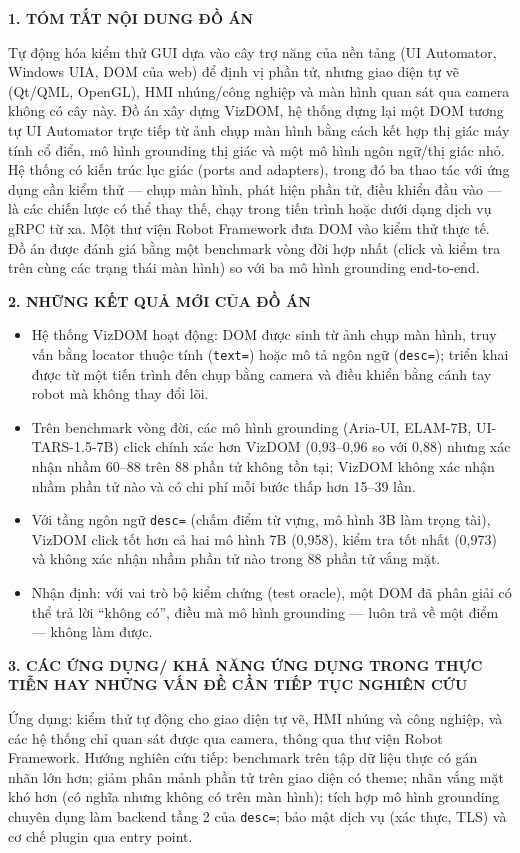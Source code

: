 \documentclass[11pt,a4paper]{article}
\newcommand{\code}[1]{\texttt{#1}}
\begin{document}
\textbf{1. TÓM TẮT NỘI DUNG ĐỒ ÁN}

Tự động hóa kiểm thử GUI dựa vào cây trợ năng của nền tảng (UI Automator, Windows
UIA, DOM của web) để định vị phần tử, nhưng giao diện tự vẽ (Qt/QML, OpenGL), HMI
nhúng/công nghiệp và màn hình quan sát qua camera không có cây này. Đồ án xây dựng
VizDOM, hệ thống dựng lại một DOM tương tự UI Automator trực tiếp từ ảnh chụp màn
hình bằng cách kết hợp thị giác máy tính cổ điển, mô hình grounding thị giác và một
mô hình ngôn ngữ/thị giác nhỏ. Hệ thống có kiến trúc lục giác (ports and adapters),
trong đó ba thao tác với ứng dụng cần kiểm thử --- chụp màn hình, phát hiện phần tử,
điều khiển đầu vào --- là các chiến lược có thể thay thế, chạy trong tiến trình hoặc
dưới dạng dịch vụ gRPC từ xa. Một thư viện Robot Framework đưa DOM vào kiểm thử thực
tế. Đồ án được đánh giá bằng một benchmark vòng đời hợp nhất (click và kiểm tra trên
cùng các trạng thái màn hình) so với ba mô hình grounding end-to-end.

\textbf{2. NHỮNG KẾT QUẢ MỚI CỦA ĐỒ ÁN}
\begin{itemize}[leftmargin=1.4em, itemsep=0.2em]
  \item Hệ thống VizDOM hoạt động: DOM được sinh từ ảnh chụp màn hình, truy vấn bằng
        locator thuộc tính (\code{text=}) hoặc mô tả ngôn ngữ (\code{desc=}); triển
        khai được từ một tiến trình đến chụp bằng camera và điều khiển bằng cánh tay
        robot mà không thay đổi lõi.
  \item Trên benchmark vòng đời, các mô hình grounding (Aria-UI, ELAM-7B,
        UI-TARS-1.5-7B) click chính xác hơn VizDOM (0,93--0,96 so với 0,88) nhưng
        xác nhận nhầm 60--88 trên 88 phần tử không tồn tại; VizDOM không xác nhận
        nhầm phần tử nào và có chi phí mỗi bước thấp hơn 15--39 lần.
  \item Với tầng ngôn ngữ \code{desc=} (chấm điểm từ vựng, mô hình 3B làm trọng tài),
        VizDOM click tốt hơn cả hai mô hình 7B (0,958), kiểm tra tốt nhất (0,973) và
        không xác nhận nhầm phần tử nào trong 88 phần tử vắng mặt.
  \item Nhận định: với vai trò bộ kiểm chứng (test oracle), một DOM đã phân giải có
        thể trả lời ``không có'', điều mà mô hình grounding --- luôn trả về một điểm
        --- không làm được.
\end{itemize}

\textbf{3. CÁC ỨNG DỤNG/ KHẢ NĂNG ỨNG DỤNG TRONG THỰC TIỄN HAY NHỮNG VẤN ĐỀ CẦN TIẾP TỤC NGHIÊN CỨU}

Ứng dụng: kiểm thử tự động cho giao diện tự vẽ, HMI nhúng và công nghiệp, và các
hệ thống chỉ quan sát được qua camera, thông qua thư viện Robot Framework. Hướng
nghiên cứu tiếp: benchmark trên tập dữ liệu thực có gán nhãn lớn hơn; giảm phân mảnh
phần tử trên giao diện có theme; nhãn vắng mặt khó hơn (có nghĩa nhưng không có trên
màn hình); tích hợp mô hình grounding chuyên dụng làm backend tầng 2 của \code{desc=};
bảo mật dịch vụ (xác thực, TLS) và cơ chế plugin qua entry point.
\newpage
\end{document}
